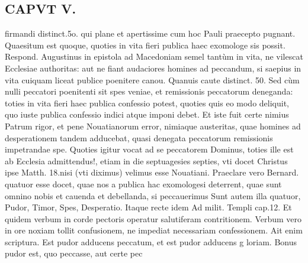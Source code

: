 \documentclass{article}
\begin{document}
\begin{pages}
\section*{CAPVT  V. }\pstart firmandi distinct.5o. qui plane et apertissime cum hoc Pauli praecepto pugnant.  \pend\pstart Quaesitum est quoque, quoties in vita fieri publica haec exomologe sis possit. Respond. Augustinus in epistola ad Macedoniam semel tantùm in vita, ne vilescat Ecclesiae authoritas: aut ne fiant audaciores homines ad peccandum, si saepius in vita cuiquam liceat publice poenitere canou. Quanuis caute distinct. 50. Sed cùm nulli peccatori poenitenti sit spes veniae, et remissionis peccatorum deneganda: toties in vita fieri haec publica confessio potest, quoties quis eo modo deliquit, quo iuste publica confessio indici atque imponi debet. Et iste fuit certe nimius Patrum rigor, et pene Nouatianorum error, nimiaque austeritas, quae homines ad desperationem tandem adducebat, quasi denegata peccatorum remissionis impetrandae spe. Quoties igitur vocat ad se peccatorem Dominus, toties ille est ab Ecclesia admittendus!, etiam in die septuagesies septies, vti docet Christus ipse Matth. 18.nisi (vti diximus) velimus esse Nouatiani.  \pend\pstart Praeclare vero Bernard. quatuor esse docet, quae nos a publica hac exomologesi deterrent, quae sunt omnino nobis et cauenda et debellanda, si peccauerimus Sunt autem illa quatuor, Pudor, Timor, Spes, Desperatio. Itaque recte idem Ad milit. Templi cap.12. Et quidem verbum in corde pectoris operatur salutiferam contritionem. Verbum vero in ore noxiam tollit confusionem, ne impediat necessariam confessionem. Ait enim scriptura. Est pudor adducens peccatum, et est pudor adducens g loriam. Bonus pudor est, quo peccasse, aut certe pec\pend

\end{pages}
\end{document}
